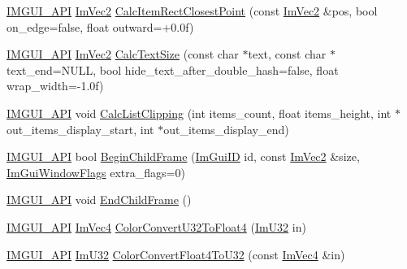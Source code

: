 \begin{DoxyCompactItemize}
\item 
\mbox{\hyperlink{imgui_8h_a43829975e84e45d1149597467a14bbf5}{I\+M\+G\+U\+I\+\_\+\+A\+PI}} \mbox{\hyperlink{struct_im_vec2}{Im\+Vec2}} \mbox{\hyperlink{namespace_im_gui_a6c66a7acf7e6eef639b5f1211d8332a3}{Calc\+Item\+Rect\+Closest\+Point}} (const \mbox{\hyperlink{struct_im_vec2}{Im\+Vec2}} \&pos, bool on\+\_\+edge=false, float outward=+0.\+0f)
\item 
\mbox{\hyperlink{imgui_8h_a43829975e84e45d1149597467a14bbf5}{I\+M\+G\+U\+I\+\_\+\+A\+PI}} \mbox{\hyperlink{struct_im_vec2}{Im\+Vec2}} \mbox{\hyperlink{namespace_im_gui_a848b9db6cc4a186751c0ecebcaadc33b}{Calc\+Text\+Size}} (const char $\ast$text, const char $\ast$text\+\_\+end=N\+U\+LL, bool hide\+\_\+text\+\_\+after\+\_\+double\+\_\+hash=false, float wrap\+\_\+width=-\/1.\+0f)
\item 
\mbox{\hyperlink{imgui_8h_a43829975e84e45d1149597467a14bbf5}{I\+M\+G\+U\+I\+\_\+\+A\+PI}} void \mbox{\hyperlink{namespace_im_gui_ae5319370628374ef8febf0c25c285b7e}{Calc\+List\+Clipping}} (int items\+\_\+count, float items\+\_\+height, int $\ast$out\+\_\+items\+\_\+display\+\_\+start, int $\ast$out\+\_\+items\+\_\+display\+\_\+end)
\item 
\mbox{\hyperlink{imgui_8h_a43829975e84e45d1149597467a14bbf5}{I\+M\+G\+U\+I\+\_\+\+A\+PI}} bool \mbox{\hyperlink{namespace_im_gui_a26d6981a769d3fbe9be9a25975b5dc6b}{Begin\+Child\+Frame}} (\mbox{\hyperlink{imgui_8h_a1785c9b6f4e16406764a85f32582236f}{Im\+Gui\+ID}} id, const \mbox{\hyperlink{struct_im_vec2}{Im\+Vec2}} \&size, \mbox{\hyperlink{imgui_8h_a0b8e067ab4f7a818828c8d89e531addc}{Im\+Gui\+Window\+Flags}} extra\+\_\+flags=0)
\item 
\mbox{\hyperlink{imgui_8h_a43829975e84e45d1149597467a14bbf5}{I\+M\+G\+U\+I\+\_\+\+A\+PI}} void \mbox{\hyperlink{namespace_im_gui_ac4bd9024554b5074805bc0ce3076c514}{End\+Child\+Frame}} ()
\item 
\mbox{\hyperlink{imgui_8h_a43829975e84e45d1149597467a14bbf5}{I\+M\+G\+U\+I\+\_\+\+A\+PI}} \mbox{\hyperlink{struct_im_vec4}{Im\+Vec4}} \mbox{\hyperlink{namespace_im_gui_a74df648cad381b5ad979c3609b7f4b2a}{Color\+Convert\+U32\+To\+Float4}} (\mbox{\hyperlink{imgui_8h_a118cff4eeb8d00e7d07ce3d6460eed36}{Im\+U32}} in)
\item 
\mbox{\hyperlink{imgui_8h_a43829975e84e45d1149597467a14bbf5}{I\+M\+G\+U\+I\+\_\+\+A\+PI}} \mbox{\hyperlink{imgui_8h_a118cff4eeb8d00e7d07ce3d6460eed36}{Im\+U32}} \mbox{\hyperlink{namespace_im_gui_abe2691de0b1a71c774ab24cc91564a94}{Color\+Convert\+Float4\+To\+U32}} (const \mbox{\hyperlink{struct_im_vec4}{Im\+Vec4}} \&in)

\end{DoxyCompactItemize}
